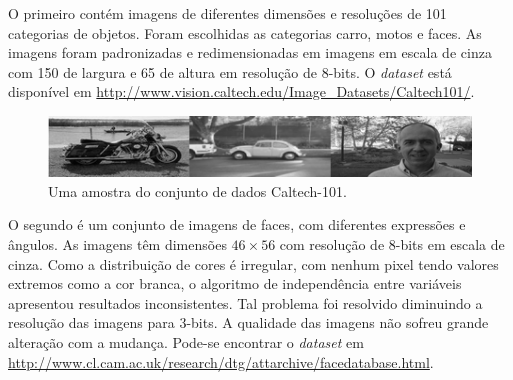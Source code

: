 \documentclass[12pt]{article}
\theoremstyle{plain}
\numberwithin{equation}{section}
\begin{document}
O primeiro contém imagens de diferentes dimensões e resoluções de 101 categorias de
objetos. Foram escolhidas as categorias carro, motos e faces. As imagens foram padronizadas e
redimensionadas em imagens em escala de cinza com 150 de largura e 65 de altura em resolução de
8-bits. O \textit{dataset} está disponível em
\url{http://www.vision.caltech.edu/Image_Datasets/Caltech101/}.

\begin{figure}[h]
  \centering\includegraphics[scale=1.0]{imgs/caltech_sample.png}
  \caption{Uma amostra do conjunto de dados Caltech-101.}
\end{figure}

O segundo é um conjunto de imagens de faces, com diferentes expressões e ângulos. As imagens têm
dimensões $46\times 56$ com resolução de 8-bits em escala de cinza. Como a distribuição de cores é
irregular, com nenhum pixel tendo valores extremos como a cor branca, o algoritmo de independência
entre variáveis apresentou resultados inconsistentes. Tal problema foi resolvido diminuindo a
resolução das imagens para 3-bits. A qualidade das imagens não sofreu grande alteração com a
mudança. Pode-se encontrar o \textit{dataset} em
\url{http://www.cl.cam.ac.uk/research/dtg/attarchive/facedatabase.html}.
\end{document}

